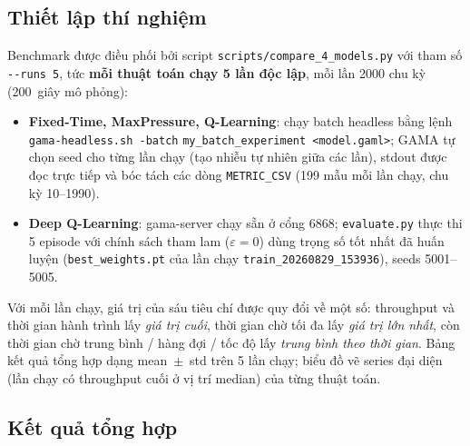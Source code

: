 \documentclass[11pt,a4paper]{article}
\begin{document}
\subsection{Thiết lập thí nghiệm}

Benchmark được điều phối bởi script \texttt{scripts/compare\_4\_models.py} với tham
số \texttt{-{}-runs 5}, tức \textbf{mỗi thuật toán chạy 5 lần độc lập}, mỗi lần
2000 chu kỳ (200~giây mô phỏng):

\begin{itemize}[leftmargin=*]
    \item \textbf{Fixed-Time, MaxPressure, Q-Learning}: chạy batch headless bằng
    lệnh \texttt{gama-headless.sh -batch} \texttt{my\_batch\_experiment <model.gaml>}; GAMA
    tự chọn seed cho từng lần chạy (tạo nhiễu tự nhiên giữa các lần), stdout được
    đọc trực tiếp và bóc tách các dòng \texttt{METRIC\_CSV} (199 mẫu mỗi lần chạy,
    chu kỳ 10--1990).
    \item \textbf{Deep Q-Learning}: gama-server chạy sẵn ở cổng 6868;
    \texttt{evaluate.py} thực thi 5 episode với chính sách tham lam ($\varepsilon=0$)
    dùng trọng số tốt nhất đã huấn luyện (\texttt{best\_weights.pt} của lần chạy
    \texttt{train\_20260829\_153936}), seeds 5001--5005.
\end{itemize}

Với mỗi lần chạy, giá trị của sáu tiêu chí được quy đổi về một số: throughput và
thời gian hành trình lấy \emph{giá trị cuối}, thời gian chờ tối đa lấy \emph{giá trị
lớn nhất}, còn thời gian chờ trung bình / hàng đợi / tốc độ lấy \emph{trung bình theo
thời gian}. Bảng kết quả tổng hợp dạng mean~$\pm$~std trên 5 lần chạy; biểu đồ vẽ
series đại diện (lần chạy có throughput cuối ở vị trí median) của từng thuật toán.

\subsection{Kết quả tổng hợp}
\end{document}
